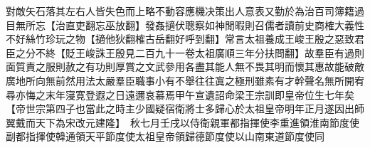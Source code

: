 對敵矢石落其左右人皆失色而上略不動容應機决策出人意表又勤於為治百司簿籍過目無所忘【治直吏翻忘巫放翻】發姦擿伏聰察如神閒暇則召儒者讀前史商榷大義性不好絲竹珍玩之物【擿他狄翻榷古岳翻好呼到翻】常言太祖養成王峻王殷之惡致君臣之分不終【貶王峻誅王殷見二百九十一卷太祖廣順三年分扶問翻】故羣臣有過則面質責之服則赦之有功則厚賞之文武參用各盡其能人無不畏其明而懷其惠故能破敵廣地所向無前然用法太嚴羣臣職事小有不舉往往寘之極刑雖素有才幹聲名無所開宥尋亦悔之末年寖寛登遐之日遠邇哀慕焉甲午宣遺詔命梁王宗訓即皇帝位生七年矣【帝世宗第四子也當此之時主少國疑宿衛將士多歸心於太祖皇帝明年正月遂因出師翼戴而天下為宋改元建隆】　秋七月壬戌以侍衛親軍都指揮使李重進領淮南節度使副都指揮使韓通領天平節度使太祖皇帝領歸德節度使以山南東道節度使同